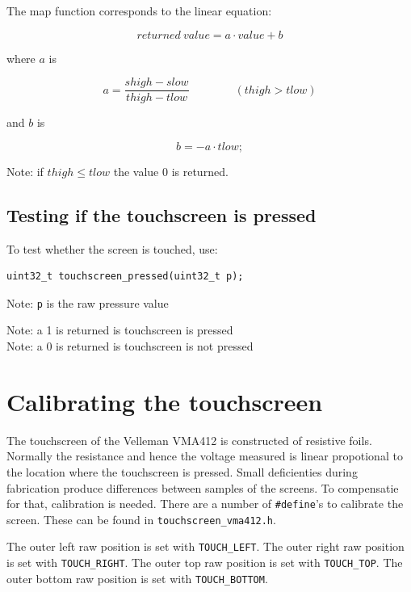 \documentclass[12pt]{article}
\begin{document}
The map function corresponds to the linear equation:

\begin{equation}
returned\ value = a\cdot value + b
\end{equation}

where $a$ is

\begin{equation}
a = \frac{shigh-slow}{thigh-tlow}\qquad\qquad(thigh>tlow)
\end{equation}

and $b$ is

\begin{equation}
b = - a\cdot tlow;
\end{equation}

Note: if $thigh \leq tlow$ the value 0 is returned.

\subsection{Testing if the touchscreen is pressed}
To test whether the screen is touched, use:

\begin{lstlisting}
uint32_t touchscreen_pressed(uint32_t p);
\end{lstlisting}

Note: \lstinline|p| is the raw pressure value

Note: a 1 is returned is touchscreen is pressed\\
Note: a 0 is returned is touchscreen is not pressed\\

\section{Calibrating the touchscreen}
The touchscreen of the Velleman VMA412 is constructed of resistive foils. Normally the resistance and hence the voltage measured is linear propotional to the location where the touchscreen is pressed. Small deficienties during fabrication produce differences between samples of the screens. To compensatie for that, calibration is needed. There are a number of \lstinline|#define|'s to calibrate the screen. These can be found in \lstinline|touchscreen_vma412.h|.

The outer left raw position is set with \lstinline|TOUCH_LEFT|. The outer right raw position is set with \lstinline|TOUCH_RIGHT|. The outer top raw position is set with \lstinline|TOUCH_TOP|. The outer bottom raw position is set with \lstinline|TOUCH_BOTTOM|.
\end{document}
